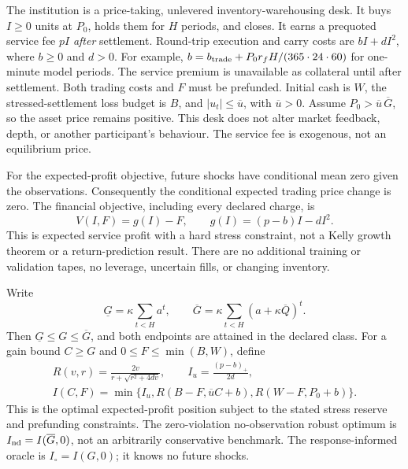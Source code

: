 The institution is a price-taking, unlevered inventory-warehousing desk.
It buys $I\ge0$ units at $P_0$, holds them for $H$ periods, and closes.
It earns a prequoted service fee $pI$ \emph{after} settlement. Round-trip
execution and carry costs are $bI+dI^2$, where $b\ge0$ and $d>0$.
For example, $b=b_{\rm trade}+P_0 r_f H/(365\cdot24\cdot60)$ for
one-minute model periods. The service premium is unavailable as collateral
until after settlement. Both trading costs and $F$ must be prefunded.
Initial cash is $W$, the stressed-settlement loss budget is $B$, and
$|u_t|\le\overline u$, with $\overline u>0$. Assume
$P_0>\overline u\,\overline G$, so the asset price remains positive.
This desk does not alter market feedback, depth, or another participant's
behaviour. The service fee is exogenous, not an equilibrium price.

For the expected-profit objective, future shocks have conditional mean zero
given the observations. Consequently the conditional expected trading price
change is zero. The financial objective, including every declared charge, is
\[
 V(I,F)=g(I)-F,\qquad g(I)=(p-b)I-dI^2.
\]
This is expected service profit with a hard stress constraint, not a Kelly
growth theorem or a return-prediction result. There are no additional training
or validation tapes, no leverage, uncertain fills, or changing inventory.

\begin{lemma}\label{fhc:capacity}
Write
\[
 \underline G=\kappa\sum_{t<H}a^t,\qquad
 \overline G=\kappa\sum_{t<H}(a+\kappa\overline Q)^t.
\]
Then $\underline G\le G\le\overline G$, and both endpoints are attained
in the declared class. For a gain bound $C\ge G$ and
$0\le F\le\min(B,W)$, define
\[
 \begin{gathered}
 R(v,r)=\frac{2v}{r+\sqrt{r^2+4dv}},\qquad I_u=\frac{(p-b)_+}{2d},\\
 I(C,F)=\min\{I_u,R(B-F,\overline u C+b),R(W-F,P_0+b)\}.
 \end{gathered}
\]
This is the optimal expected-profit position subject to the stated stress
reserve and prefunding constraints. The zero-violation no-observation robust optimum is
$I_{\rm nd}=I(\overline G,0)$, not an arbitrarily conservative benchmark.
The response-informed oracle is $I_\circ=I(G,0)$; it knows no future shocks.
\end{lemma}

